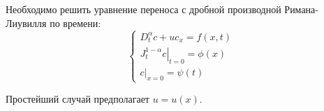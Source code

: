 Необходимо решить уравнение переноса с дробной производной Римана-Лиувилля по времени:
\begin{equation}
	\begin{cases}
		D^\alpha_t c + u c_x = f(x,t)\\
		\left.J^{1-\alpha}_tc\right|_{t=0} = \phi(x)\\
		\left.c\right|_{x=0}=\psi(t)
	\end{cases}
\end{equation}

Простейший случай предполагает $u=u(x)$.
